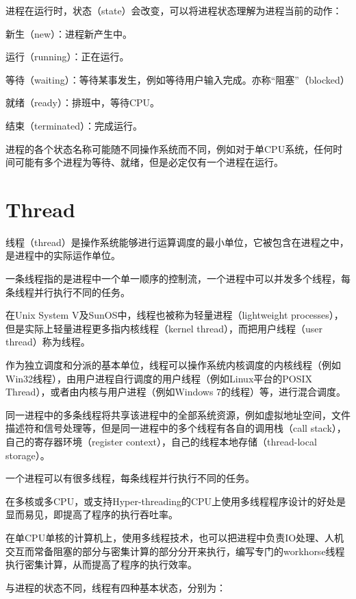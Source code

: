 进程在运行时，状态（state）会改变，可以将进程状态理解为进程当前的动作：

\begin{compactitem}
\item 新生（new）：进程新产生中。
\item 运行（running）：正在运行。
\item 等待（waiting）：等待某事发生，例如等待用户输入完成。亦称“阻塞”（blocked）
\item 就绪（ready）：排班中，等待CPU。
\item 结束（terminated）：完成运行。
\end{compactitem}

进程的各个状态名称可能随不同操作系统而不同，例如对于单CPU系统，任何时间可能有多个进程为等待、就绪，但是必定仅有一个进程在运行。


\section{Thread}

线程（thread）是操作系统能够进行运算调度的最小单位，它被包含在进程之中，是进程中的实际运作单位。

一条线程指的是进程中一个单一顺序的控制流，一个进程中可以并发多个线程，每条线程并行执行不同的任务。

在Unix System V及SunOS中，线程也被称为轻量进程（lightweight processes），但是实际上轻量进程更多指内核线程（kernel thread），而把用户线程（user thread）称为线程。

作为独立调度和分派的基本单位，线程可以操作系统内核调度的内核线程（例如Win32线程），由用户进程自行调度的用户线程（例如Linux平台的POSIX Thread），或者由内核与用户进程（例如Windows 7的线程）等，进行混合调度。

同一进程中的多条线程将共享该进程中的全部系统资源，例如虚拟地址空间，文件描述符和信号处理等，但是同一进程中的多个线程有各自的调用栈（call stack），自己的寄存器环境（register context），自己的线程本地存储（thread-local storage）。



一个进程可以有很多线程，每条线程并行执行不同的任务。

在多核或多CPU，或支持Hyper-threading的CPU上使用多线程程序设计的好处是显而易见，即提高了程序的执行吞吐率。

在单CPU单核的计算机上，使用多线程技术，也可以把进程中负责IO处理、人机交互而常备阻塞的部分与密集计算的部分分开来执行，编写专门的workhorse线程执行密集计算，从而提高了程序的执行效率。

与进程的状态不同，线程有四种基本状态，分别为：

